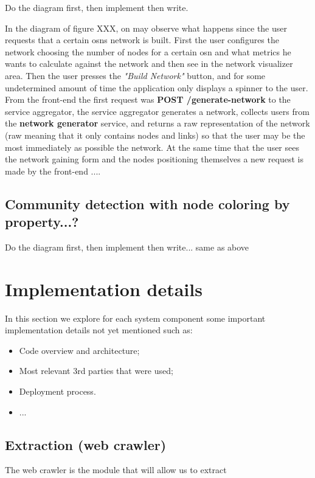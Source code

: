 \begin{huge}
Do the diagram first, then implement then write.
\end{huge}
In the diagram of figure XXX, on may observe what happens since the user requests that a certain \glspl{osn} network is built.
First the user configures the network choosing the number of nodes for a certain \gls{osn} and what metrics he wants to calculate against the network
and then see in the network visualizer area. Then the user presses the \textit{"Build Network"} button, and for some undetermined amount of time
the application only displays a spinner to the user. From the front-end the first request was \textbf{POST /generate-network} to the service aggregator, the service aggregator generates a network, collects users from the \textbf{network generator} service, and returns a raw representation of the network (raw meaning that it only contains nodes and links) so that the user may be the most immediately as possible the network. At the same time that the user sees the network gaining form and the nodes positioning themselves a new request is made by the front-end ....

\subsection{Community detection with node coloring by property...?}
\begin{huge}
Do the diagram first, then implement then write... same as above
\end{huge}

\section{Implementation details}
In this section we explore for each system component some important implementation details not yet mentioned such as:
\begin{itemize}
    \item Code overview and architecture;
    \item Most relevant 3rd parties that were used;
    \item Deployment process.
    \item ...
\end{itemize}


\subsection{Extraction (web crawler)}
The web crawler is the module that will allow us to extract



